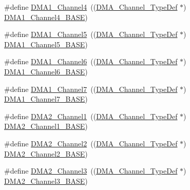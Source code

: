 \begin{DoxyCompactItemize}
\item 
\#define \mbox{\hyperlink{group___peripheral__declaration_gad2c42743316bf64da557130061b1f56a}{D\+M\+A1\+\_\+\+Channel4}}~((\mbox{\hyperlink{struct_d_m_a___channel___type_def}{D\+M\+A\+\_\+\+Channel\+\_\+\+Type\+Def}} $\ast$) \mbox{\hyperlink{group___peripheral__memory__map_ga1adc93cd0baf0897202c71110e045692}{D\+M\+A1\+\_\+\+Channel4\+\_\+\+B\+A\+SE}})
\item 
\#define \mbox{\hyperlink{group___peripheral__declaration_ga06ff98ddef3c962795d2e2444004abff}{D\+M\+A1\+\_\+\+Channel5}}~((\mbox{\hyperlink{struct_d_m_a___channel___type_def}{D\+M\+A\+\_\+\+Channel\+\_\+\+Type\+Def}} $\ast$) \mbox{\hyperlink{group___peripheral__memory__map_gac041a71cd6c1973964f847a68aa14478}{D\+M\+A1\+\_\+\+Channel5\+\_\+\+B\+A\+SE}})
\item 
\#define \mbox{\hyperlink{group___peripheral__declaration_gac013c4376e4797831b5ddd2a09519df8}{D\+M\+A1\+\_\+\+Channel6}}~((\mbox{\hyperlink{struct_d_m_a___channel___type_def}{D\+M\+A\+\_\+\+Channel\+\_\+\+Type\+Def}} $\ast$) \mbox{\hyperlink{group___peripheral__memory__map_ga896c2c7585dd8bc3969cf8561f689d2d}{D\+M\+A1\+\_\+\+Channel6\+\_\+\+B\+A\+SE}})
\item 
\#define \mbox{\hyperlink{group___peripheral__declaration_ga4f9c23b3d1add93ed206b5c9afa5cda3}{D\+M\+A1\+\_\+\+Channel7}}~((\mbox{\hyperlink{struct_d_m_a___channel___type_def}{D\+M\+A\+\_\+\+Channel\+\_\+\+Type\+Def}} $\ast$) \mbox{\hyperlink{group___peripheral__memory__map_gaeee0d1f77d0db1db533016a09351166c}{D\+M\+A1\+\_\+\+Channel7\+\_\+\+B\+A\+SE}})
\item 
\#define \mbox{\hyperlink{group___peripheral__declaration_gad86c75e1ff89e03e15570f47962865c8}{D\+M\+A2\+\_\+\+Channel1}}~((\mbox{\hyperlink{struct_d_m_a___channel___type_def}{D\+M\+A\+\_\+\+Channel\+\_\+\+Type\+Def}} $\ast$) \mbox{\hyperlink{group___peripheral__memory__map_gad3bd6c4201d12f5d474518c1b02f8e3b}{D\+M\+A2\+\_\+\+Channel1\+\_\+\+B\+A\+SE}})
\item 
\#define \mbox{\hyperlink{group___peripheral__declaration_ga316024020799373b9d8e35c316c74f24}{D\+M\+A2\+\_\+\+Channel2}}~((\mbox{\hyperlink{struct_d_m_a___channel___type_def}{D\+M\+A\+\_\+\+Channel\+\_\+\+Type\+Def}} $\ast$) \mbox{\hyperlink{group___peripheral__memory__map_ga22f39f23c879c699b88e04a629f69d1c}{D\+M\+A2\+\_\+\+Channel2\+\_\+\+B\+A\+SE}})
\item 
\#define \mbox{\hyperlink{group___peripheral__declaration_ga6dca52a79587e0ca9a5d669048b4c7eb}{D\+M\+A2\+\_\+\+Channel3}}~((\mbox{\hyperlink{struct_d_m_a___channel___type_def}{D\+M\+A\+\_\+\+Channel\+\_\+\+Type\+Def}} $\ast$) \mbox{\hyperlink{group___peripheral__memory__map_ga6f2369b8bc155fb55a28891987605c2c}{D\+M\+A2\+\_\+\+Channel3\+\_\+\+B\+A\+SE}})

\end{DoxyCompactItemize}
